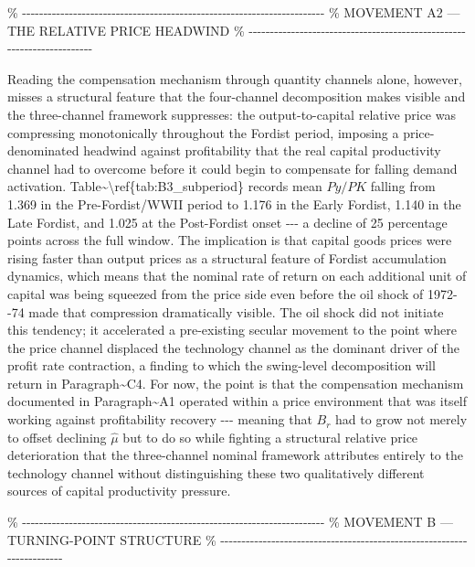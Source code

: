 \%
-\/-\/-\/-\/-\/-\/-\/-\/-\/-\/-\/-\/-\/-\/-\/-\/-\/-\/-\/-\/-\/-\/-\/-\/-\/-\/-\/-\/-\/-\/-\/-\/-\/-\/-\/-\/-\/-\/-\/-\/-\/-\/-\/-\/-\/-\/-\/-\/-\/-\/-\/-\/-\/-\/-\/-\/-\/-\/-\/-\/-\/-\/-\/-\/-\/-\/-\/-\/-\/-\/-
\% MOVEMENT A2 --- THE RELATIVE PRICE HEADWIND \%
-\/-\/-\/-\/-\/-\/-\/-\/-\/-\/-\/-\/-\/-\/-\/-\/-\/-\/-\/-\/-\/-\/-\/-\/-\/-\/-\/-\/-\/-\/-\/-\/-\/-\/-\/-\/-\/-\/-\/-\/-\/-\/-\/-\/-\/-\/-\/-\/-\/-\/-\/-\/-\/-\/-\/-\/-\/-\/-\/-\/-\/-\/-\/-\/-\/-\/-\/-\/-\/-\/-

Reading the compensation mechanism through quantity channels alone,
however, misses a structural feature that the four-channel decomposition
makes visible and the three-channel framework suppresses: the
output-to-capital relative price was compressing monotonically
throughout the Fordist period, imposing a price-denominated headwind
against profitability that the real capital productivity channel had to
overcome before it could begin to compensate for falling demand
activation. Table\textasciitilde\textbackslash ref\{tab:B3\_subperiod\}
records mean \(Py/PK\) falling from 1.369 in the Pre-Fordist/WWII period
to 1.176 in the Early Fordist, 1.140 in the Late Fordist, and 1.025 at
the Post-Fordist onset -\/-\/- a decline of 25 percentage points across
the full window. The implication is that capital goods prices were
rising faster than output prices as a structural feature of Fordist
accumulation dynamics, which means that the nominal rate of return on
each additional unit of capital was being squeezed from the price side
even before the oil shock of 1972-\/-74 made that compression
dramatically visible. The oil shock did not initiate this tendency; it
accelerated a pre-existing secular movement to the point where the price
channel displaced the technology channel as the dominant driver of the
profit rate contraction, a finding to which the swing-level
decomposition will return in Paragraph\textasciitilde C4. For now, the
point is that the compensation mechanism documented in
Paragraph\textasciitilde A1 operated within a price environment that was
itself working against profitability recovery -\/-\/- meaning that
\(B_{r}\) had to grow not merely to offset declining \(\hat{\mu}\) but
to do so while fighting a structural relative price deterioration that
the three-channel nominal framework attributes entirely to the
technology channel without distinguishing these two qualitatively
different sources of capital productivity pressure.

\%
-\/-\/-\/-\/-\/-\/-\/-\/-\/-\/-\/-\/-\/-\/-\/-\/-\/-\/-\/-\/-\/-\/-\/-\/-\/-\/-\/-\/-\/-\/-\/-\/-\/-\/-\/-\/-\/-\/-\/-\/-\/-\/-\/-\/-\/-\/-\/-\/-\/-\/-\/-\/-\/-\/-\/-\/-\/-\/-\/-\/-\/-\/-\/-\/-\/-\/-\/-\/-\/-\/-
\% MOVEMENT B --- TURNING-POINT STRUCTURE \%
-\/-\/-\/-\/-\/-\/-\/-\/-\/-\/-\/-\/-\/-\/-\/-\/-\/-\/-\/-\/-\/-\/-\/-\/-\/-\/-\/-\/-\/-\/-\/-\/-\/-\/-\/-\/-\/-\/-\/-\/-\/-\/-\/-\/-\/-\/-\/-\/-\/-\/-\/-\/-\/-\/-\/-\/-\/-\/-\/-\/-\/-\/-\/-\/-\/-\/-\/-\/-\/-\/-

